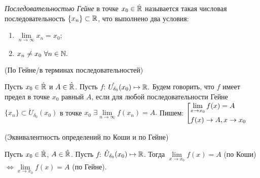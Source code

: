 \newpage
\begin{definition}
    \textit{Последовательностью Гейне} в точке $x_{0} \in \Hat{\mathbb{R}}$ называется такая числовая последовательность $\{ x_{n} \} \subset \mathbb{R}$, что выполнено два условия:
    \begin{enumerate}
        \item $\lim\limits_{n\to \infty} x_{n} = x_{0};$
        \item $x_{n} \neq x_{0} \  \forall n \in \mathbb{N}.$
    \end{enumerate}
\end{definition}
\begin{definition}
    \hypertarget{def4.5}{(По Гейне/в терминах последовательностей)} Пусть $x_{0} \in \Hat{\mathbb{R}}$ и $A \in \Hat{\mathbb{R}}$. Пусть $f$: $\mathring{U_{\delta_{0}}} (x_{0}) \mapsto \mathbb{R}.$ Будем говорить, что $f$ имеет предел в точке $x_{0}$ равный $A$, если для любой последовательности Гейне $\{ x_{n} \} \subset \mathring{U}_{\delta_{0}} (x_{0})$ в точке $x_{0}$ $\exists \lim\limits_{n\to \infty} f (x_{n}) = A.$ Пишем:
    $
\left[
\begin{gathered}
    \lim\limits_{x\to x_0} f(x) = A
    \hfill 
    \\ 
    f(x) \to A, x \to x_0
\end{gathered}
\right.$
\end{definition}
\begin{theorem}
    \hypertarget{thm4.1}{(Эквивалентность определений по Коши и по Гейне)} Пусть $x_{0} \in \Hat{\mathbb{R}}$, $A \in \Hat{\mathbb{R}}$. Пусть $f$: $\mathring{U}_{\delta_{0}} (x_{0}) \mapsto \mathbb{R}$. Тогда $\lim\limits_{x\to x_{0}} f (x) = A$ (по Коши) $\Leftrightarrow \lim\limits_{x\to x_{0}} f (x) = A$ (по Гейне).
\end{theorem}
